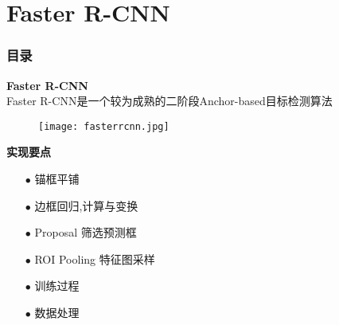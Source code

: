 \section{Faster R-CNN}
\begin{frame}[allowframebreaks]
    \frametitle{\textsc{目录}} \vspace{-0.3cm}
    \begin{spacing}{0.0}
    \end{spacing}   %
\end{frame}

\begin{frame}
    \vspace{0.5em}
    \noindent\large\textbf{Faster R-CNN}\\
    \vspace{0.5em}
    Faster R-CNN是一个较为成熟的二阶段Anchor-based目标检测算法\\
    \vspace{0.5em}
    \begin{figure}
        \texttt{[image: fasterrcnn.jpg]}
    \end{figure}
\end{frame}

\begin{frame}[allowframebreaks]
    \vspace{-0.2cm}
    {\noindent\large\textbf{实现要点}}
    \vspace{0.4cm}
    \begin{itemize}
        \item[$ \bullet $] 锚框平铺
        \item[$ \bullet $] 边框回归,计算与变换
        \item[$ \bullet $] Proposal 筛选预测框
        \item[$ \bullet $] ROI Pooling 特征图采样
        \item[$ \bullet $] 训练过程
        \item[$ \bullet $] 数据处理
    \end{itemize}

\end{frame}

